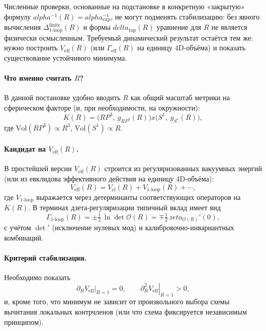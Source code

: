 \documentclass[12pt]{article}
\def\mathbb#1{#1}%
\def\alpha{alpha}%
\def\delta{delta}%
\def\times{x}%
\def\zeta{zeta}%
\begin{document}
Численные проверки, основанные на подстановке в конкретную «закрытую» формулу $\alpha^{-1}(R)=\alpha^{-1}_{\mathrm{exp}}$, не могут подменять стабилизацию: без явного вычисления $\Delta_{\mathrm{1\text{-}loop}}^{\mathrm{finite}}(R)$ и формы $\delta_{\mathrm{top}}(R)$ уравнение для $R$ не является физически осмысленным.
Требуемый динамический результат остаётся тем же: нужно построить $V_{\mathrm{eff}}(R)$ (или $\Gamma_{\mathrm{eff}}(R)$ на единицу 4D-объёма) и показать существование устойчивого минимума.


\paragraph{Что именно считать $R$?}
В данной постановке удобно вводить $R$ как общий масштаб метрики на сферическом факторе (и, при необходимости, на окружности):
\begin{equation}
K(R)=\bigl(\mathbb{RP}^3,\ g_{\mathbb{RP}^3}(R)\bigr)\times \bigl(S^1,\ g_{S^1}(R)\bigr),
\end{equation}
где $\mathrm{Vol}(\mathbb{RP}^3)\propto R^3$, $\mathrm{Vol}(S^1)\propto R$.

\paragraph{Кандидат на $V_{\mathrm{eff}}(R)$.}
В простейшей версии $V_{\mathrm{eff}}(R)$ строится из регуляризованных вакуумных энергий (или из евклидова эффективного действия на единицу 4D-объёма):
\begin{equation}
V_{\mathrm{eff}}(R)=V_{\mathrm{cl}}(R)+V_{\mathrm{1\text{-}loop}}(R)+\cdots,
\end{equation}
где $V_{\mathrm{1\text{-}loop}}$ выражается через детерминанты соответствующих операторов на $K(R)$.
В терминах дзета-регуляризации типичный вклад имеет вид
\begin{equation}
\Gamma_{\mathrm{1\text{-}loop}}(R)=\pm\tfrac12\,\ln\det \mathcal{O}(R)=\mp\tfrac12\,\zeta_{\mathcal{O}(R)}'(0),
\end{equation}
с учётом $\det'$ (исключение нулевых мод) и калибровочно-инвариантных комбинаций.

\paragraph{Критерий стабилизации.}
Необходимо показать
\begin{equation}
\left.\partial_R V_{\mathrm{eff}}\right|_{R=1}=0,
\qquad
\left.\partial_R^2 V_{\mathrm{eff}}\right|_{R=1}>0,
\end{equation}
и, кроме того, что минимум не зависит от произвольного выбора схемы вычитания локальных контрчленов (или что схема фиксируется независимым принципом).
\end{document}
